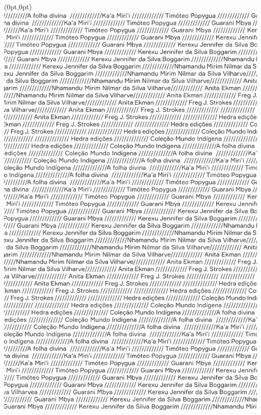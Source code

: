 \thispagestyle{empty}
\begin{textblock*}{2.625in}(0pt,0pt)%
\vspace*{-2.4cm}
\hspace*{-2.3cm}\includegraphics[width=138mm]{./ABERTURA.png}  
\end{textblock*}
\clearpage

\thispagestyle{empty}



